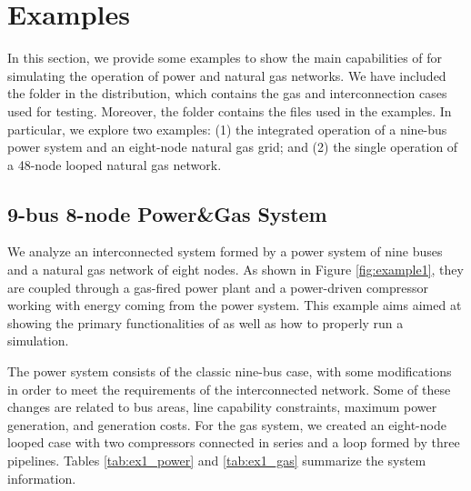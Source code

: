 \chapter{Examples}
\label{chap:examples}
In this section, we provide some examples to show the main capabilities of \mpng{} for simulating the operation of power and natural gas networks. We have included the folder \mpngcasepath{} in the distribution, which contains the gas and interconnection cases used for testing. Moreover, the folder \mpngexamplepath{} contains the files used in the examples. In particular, we explore two examples: (1) the integrated operation of a nine-bus power system  and an eight-node natural gas grid; and (2) the single operation of a 48-node looped natural gas network.

\section{9-bus 8-node Power\&Gas System}
\label{sec:8-9_gas_power}

We analyze an interconnected system formed by a power system of nine buses  and a natural gas network of eight nodes. As shown in Figure \ref{fig:example1}, they are coupled through a gas-fired power plant and a power-driven compressor working with energy coming from the power system. This example aims aimed at showing the primary functionalities of \mpng{} as well as how to properly run a simulation. 

The power system consists of the classic \matpower{} nine-bus case, with some modifications in order to meet the requirements of the interconnected network. Some of these changes are related to bus areas, line capability constraints, maximum power generation, and generation costs. For the gas system, we created an eight-node looped case with two compressors connected in series and a loop formed by three pipelines. Tables \ref{tab:ex1_power} and \ref{tab:ex1_gas} summarize the system information. 

